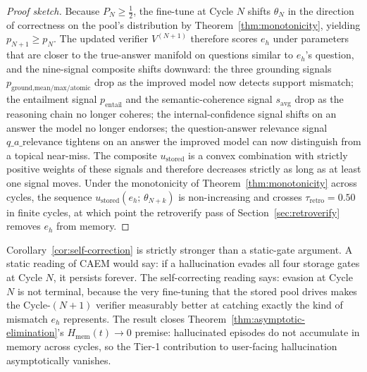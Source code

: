 \begin{proof}[Proof sketch]
Because $P_{N} \geq \tfrac{1}{2}$, the fine-tune at Cycle $N$ shifts $\theta_{N}$ in the direction of correctness on the pool's distribution by Theorem~\ref{thm:monotonicity}, yielding $p_{N+1} \geq p_{N}$. The updated verifier $V^{(N+1)}$ therefore scores $e_{h}$ under parameters that are closer to the true-answer manifold on questions similar to $e_{h}$'s question, and the nine-signal composite shifts downward: the three grounding signals $p_{\text{ground,mean/max/atomic}}$ drop as the improved model now detects support mismatch; the entailment signal $p_{\text{entail}}$ and the semantic-coherence signal $s_{\text{avg}}$ drop as the reasoning chain no longer coheres; the internal-confidence signal shifts on an answer the model no longer endorses; the question-answer relevance signal $q\_a\_\text{relevance}$ tightens on an answer the improved model can now distinguish from a topical near-miss. The composite $u_{\text{stored}}$ is a convex combination with strictly positive weights of these signals and therefore decreases strictly as long as at least one signal moves. Under the monotonicity of Theorem~\ref{thm:monotonicity} across cycles, the sequence $u_{\text{stored}}(e_{h};\, \theta_{N+k})$ is non-increasing and crosses $\tau_{\text{retro}} = 0.50$ in finite cycles, at which point the retroverify pass of Section~\ref{sec:retroverify} removes $e_{h}$ from memory.
\end{proof}

Corollary~\ref{cor:self-correction} is strictly stronger than a static-gate argument. A static reading of CAEM would say: if a hallucination evades all four storage gates at Cycle $N$, it persists forever. The self-correcting reading says: evasion at Cycle $N$ is not terminal, because the very fine-tuning that the stored pool drives makes the Cycle-$(N+1)$ verifier measurably better at catching exactly the kind of mismatch $e_{h}$ represents. The result closes Theorem~\ref{thm:asymptotic-elimination}'s $H_{\text{mem}}(t) \to 0$ premise: hallucinated episodes do not accumulate in memory across cycles, so the Tier-1 contribution to user-facing hallucination asymptotically vanishes.

